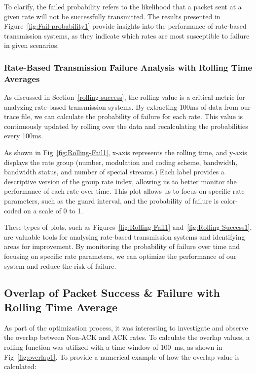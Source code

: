 To clarify, the failed probability refers to the likelihood that a packet sent at a given rate will not be successfully transmitted. The results presented in Figure~\ref{fig:Fail-probability1} provide insights into the performance of rate-based transmission systems, as they indicate which rates are most susceptible to failure in given scenarios.

\subsubsection{Rate-Based Transmission Failure Analysis with Rolling Time Averages}
\label{Rolling-fail}
As discussed in Section~\ref{rolling-success}, the rolling value is a critical metric for analyzing rate-based transmission systems. By extracting 100ms of data from our trace file, we can calculate the probability of failure for each rate. This value is continuously updated by rolling over the data and recalculating the probabilities every 100ms.

As shown in Fig~\ref{fig:Rolling-Fail1}, x-axis represents the rolling time, and y-axis displays the rate group (number, modulation and coding scheme, bandwidth, bandwidth status, and number of special streams.) Each label provides a descriptive version of the group rate index, allowing us to better monitor the performance of each rate over time. This plot allows us to focus on specific rate parameters, such as the guard interval, and the probability of failure is color-coded on a scale of 0 to 1. 

These types of plots, such as Figures~\ref{fig:Rolling-Fail1} and~\ref{fig:Rolling-Success1}, are valuable tools for analysing rate-based transmission systems and identifying areas for improvement. By monitoring the probability of failure over time and focusing on specific rate parameters, we can optimize the performance of our system and reduce the risk of failure.


\subsection{Overlap of Packet Success \& Failure with Rolling Time Average }
\label{Overlap}

As part of the optimization process, it was interesting to investigate and observe the overlap between Non-ACK and ACK rates. To calculate the overlap values, a rolling function was utilized with a time window of 100~ms, as shown in Fig~\ref{fig:overlap1}. To provide a numerical example of how the overlap value is calculated:

